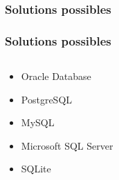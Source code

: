 \subsubsection[Solutions possibles]{Solutions possibles}
\begin{frame}
\frametitle{Solutions possibles}
\begin{columns}
\begin{column}{5cm}
\begin{itemize}[<+->]
	\item<2-> Oracle Database
	\item<3-> PostgreSQL
	\item<4-> MySQL
	\item<5-> Microsoft SQL Server
	\item<6-> SQLite
\end{itemize}
\end{column}
\begin{column}{7cm}


\end{column}
\end{columns}
\end{frame}
